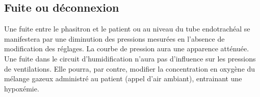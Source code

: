 \subsection{Fuite ou déconnexion}

Une fuite entre le phasitron et le patient ou au niveau du tube endotrachéal se
manifestera par une diminution des pressions mesurées en l'absence de
modification des réglages. La courbe de pression aura une apparence atténuée.
Une fuite dans le circuit d'humidification n’aura pas d'influence sur les
pressions de ventilations. Elle pourra, par contre, modifier la concentration
en oxygène du mélange gazeux administré au patient (appel d’air ambiant),
entrainant une hypoxémie.
